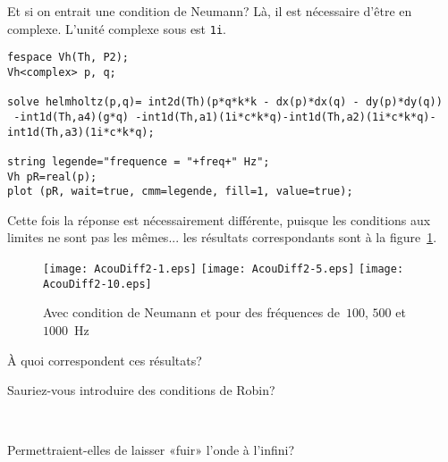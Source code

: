 \medskip
Et si on entrait une condition de Neumann? Là, il est nécessaire d'être en complexe. L'unité complexe sous \freefem est \verb|1i|.
\begin{lstlisting}[firstnumber=14]
fespace Vh(Th, P2);
Vh<complex> p, q;

solve helmholtz(p,q)= int2d(Th)(p*q*k*k - dx(p)*dx(q) - dy(p)*dy(q))
 -int1d(Th,a4)(g*q) -int1d(Th,a1)(1i*c*k*q)-int1d(Th,a2)(1i*c*k*q)-int1d(Th,a3)(1i*c*k*q);

string legende="frequence = "+freq+" Hz";
Vh pR=real(p);
plot (pR, wait=true, cmm=legende, fill=1, value=true);
\end{lstlisting}
Cette fois la réponse est nécessairement différente, puisque les conditions aux limites ne sont pas les mêmes... les résultats correspondants sont à la figure~\ref{Fig-AcouDiff2}.
\begin{figure}[h!]
\centering
   \texttt{[image: AcouDiff2-1.eps]}\hfill
   \texttt{[image: AcouDiff2-5.eps]}\hfill
   \texttt{[image: AcouDiff2-10.eps]}
\caption{Avec condition de Neumann et pour des fréquences de~$100$, $500$ et $1000$~Hz}\label{Fig-AcouDiff2}
\end{figure}

\medskip
À quoi correspondent ces résultats?
\begin{flushright}
\end{flushright}

Sauriez-vous introduire des conditions de Robin?
\begin{flushright}
\\
\end{flushright}

Permettraient-elles de laisser «fuir» l'onde à l'infini?
\begin{flushright}
\\
\end{flushright}

